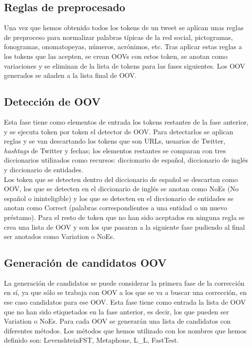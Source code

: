 \documentclass[spanish,12pt, a4paper,twoside]{paper}
\begin{document}
\subsection{Reglas de preprocesado}\label{sec:reglasdepreprocesado}
Una vez que hemos obtenido todos los tokens de un tweet se aplican unas reglas de preproceso para normalizar palabras típicas de la red social, pictogramas, fonogramas, onomatopeyas, números, acrónimos, etc. Tras aplicar estas reglas a los tokens que las acepten, se crean OOVs con estos token, se anotan como variaciones y se eliminan de la lista de tokens para las fases siguientes. Los OOV generados se añaden a la lista final de OOV.

\subsection{Detección de OOV}\label{sec:detecciondeoov}
Esta fase tiene como elementos de entrada los tokens restantes de la fase anterior, y se ejecuta token por token el detector de OOV. Para detectarlos se aplican reglas y se van descartando los tokens que son URLs, usuarios de Twitter, \textit{hashtags} de Twitter y fechas; los elementos restantes se comparan con tres diccionarios utilizados como recursos: diccionario de español, diccionario de inglés y diccionario de entidades.\\

Los token que se detecten dentro del diccionario de español se descartan como OOV, los que se detecten en el diccionario de inglés se anotan como NoEs (No español o ininteligible) y los que se detecten en el diccionario de entidades se anotan como Correct (palabras correspondientes a una entidad o un nuevo préstamo). Para el resto de token que no han sido aceptados en ninguna regla se crea una lista de OOV y son los que pasaran a la siguiente fase pudiendo al final ser anotados como Variation o NoEs.

\subsection{Generación de candidatos OOV}\label{sec:generaciondecandidatosoov}
La generación de candidatos se puede considerar la primera fase de la corrección en sí, ya que sólo se trabaja con OOV a los que se va a buscar una corrección, en ese caso candidatos para ese OOV.
Esta fase tiene como entrada la lista de OOV que no han sido etiquetados en la fase anterior, es decir, los que pueden ser Variation o NoEs. Para cada OOV se generarán una lista de candidatos con diferentes métodos. Los métodos que hemos utilizado con los nombres que hemos definido son: LevenshteinFST, Metaphone, L\_L, FastTest.
\end{document}
